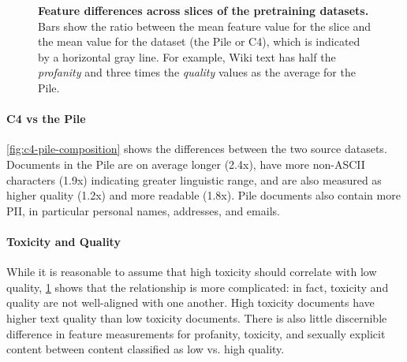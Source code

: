 \documentclass{article}
\begin{document}
\begin{figure}[ht]
{    }
    \caption{
     \small \textbf{Feature differences across slices of the pretraining datasets.} 
     Bars show the ratio between the mean feature value for the slice and the mean value for the dataset (the Pile or C4), which is indicated by a horizontal gray line.
     For example, Wiki text has half the \textit{profanity} and three times the \textit{quality} values as the average for the Pile.
    }
    \vspace{-3mm}
    \label{fig:composition-analysis}
\end{figure}

\vspace{-3mm}
\paragraph{C4 vs the Pile}
\cref{fig:c4-pile-composition} shows the differences between the two source datasets. 
Documents in the Pile are on average longer (2.4x), have more non-ASCII characters (1.9x) indicating greater linguistic range, and are also measured as higher quality (1.2x) and more readable (1.8x).
Pile documents also contain more PII, in particular personal names, addresses, and emails.

\vspace{-3mm}
\paragraph{Toxicity and Quality}
While it is reasonable to assume that high toxicity should correlate with low quality, 
\cref{fig:composition-analysis} shows that the relationship is more complicated: 
in fact, toxicity and quality are not well-aligned with one another.
High toxicity documents have higher text quality than low toxicity documents.
There is also little discernible difference in feature measurements for profanity, toxicity, and sexually explicit content between content classified as low vs. high quality.

\vspace{-3mm}
\end{document}
